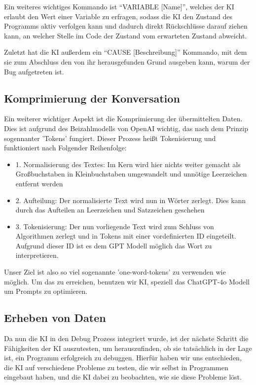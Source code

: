 \documentclass[a4paper,12pt,ngerman]{scrartcl}
\begin{document}
Ein weiteres wichtiges Kommando ist ``VARIABLE [Name]'', welches der KI erlaubt den Wert einer Variable zu erfragen, sodass die KI den Zustand des Programms aktiv verfolgen kann und dadurch direkt Rückschlüsse darauf ziehen kann, an welcher Stelle im Code der Zustand vom erwarteten Zustand abweicht.

Zuletzt hat die KI außerdem ein ``CAUSE [Beschreibung]'' Kommando, mit dem sie zum Abschluss den von ihr herausgefunden Grund ausgeben kann, warum der Bug aufgetreten ist.

\subsection{Komprimierung der Konversation}

Ein weiterer wichtiger Aspekt ist die Komprimierung der übermittelten Daten. Dies ist aufgrund des Beizahlmodells von OpenAI wichtig, das nach dem Prinzip sogennanter 'Tokens' fungiert. Dieser Prozess heißt Tokenisierung und funktioniert nach Folgender Reihenfolge:
\begin{itemize}
	\item 1. Normalisierung des Textes: Im Kern wird hier nichts weiter gemacht als Großbuchstaben in Kleinbuchstaben umgewandelt und unnötige Leerzeichen entfernt werden 
	\item 2. Aufteilung: Der normalisierte Text wird nun in Wörter zerlegt. Dies kann durch das Aufteilen an Leerzeichen und Satzzeichen geschehen
	\item 3. Tokenisierung: Der nun vorliegende Text wird zum Schluss von Algorithmen zerlegt und in Tokens mit einer vordefinierten ID eingeteilt. Aufgrund dieser ID ist es dem GPT Modell möglich das Wort zu interpretieren.
\end{itemize}
Unser Ziel ist also so viel sogenannte 'one-word-tokens' zu verwenden wie möglich. Um das zu erreichen, benutzen wir KI, speziell das ChatGPT-4o Modell um Prompts zu optimieren.

\subsection{Erheben von Daten}

Da nun die KI in den Debug Prozess integriert wurde, ist der nächste Schritt die Fähigkeiten der KI auszutesten, um herauszufinden, ob sie tatsächlich in der Lage ist, ein Programm erfolgreich zu debuggen. Hierfür haben wir uns entschieden, die KI auf verschiedene Probleme zu testen, die wir selbst in Programmen eingebaut haben, und die KI dabei zu beobachten, wie sie diese Probleme löst.
\end{document}

